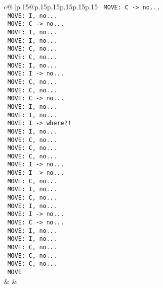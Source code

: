 \documentclass{article}
\begin{document}
{\begin{supertabular}{c@{$\;$}|p{.15\linewidth}@{}p{.15\linewidth}p{.15\linewidth}p{.15\linewidth}p{.15\linewidth}p{.15\linewidth}}
{{{\texttt{ MOVE: C {-}> no...} \\
\texttt{ MOVE: I, no...} \\
\texttt{ MOVE: C {-}> no...} \\
\texttt{ MOVE: I, no...} \\
\texttt{ MOVE: I, no...} \\
\texttt{ MOVE: C, no...} \\
\texttt{ MOVE: C, no...} \\
\texttt{ MOVE: I, no...} \\
\texttt{ MOVE: I {-}> no...} \\
\texttt{ MOVE: C, no...} \\
\texttt{ MOVE: C, no...} \\
\texttt{ MOVE: C {-}> no...} \\
\texttt{ MOVE: I, no...} \\
\texttt{ MOVE: I, no...} \\
\texttt{ MOVE: I {-}> where?!} \\
\texttt{ MOVE: I, no...} \\
\texttt{ MOVE: C, no...} \\
\texttt{ MOVE: C, no...} \\
\texttt{ MOVE: C, no...} \\
\texttt{ MOVE: I {-}> no...} \\
\texttt{ MOVE: I {-}> no...} \\
\texttt{ MOVE: C, no...} \\
\texttt{ MOVE: I, no...} \\
\texttt{ MOVE: C, no...} \\
\texttt{ MOVE: I, no...} \\
\texttt{ MOVE: I {-}> no...} \\
\texttt{ MOVE: C {-}> no...} \\
\texttt{ MOVE: I, no...} \\
\texttt{ MOVE: I, no...} \\
\texttt{ MOVE: C, no...} \\
\texttt{ MOVE: C, no...} \\
\texttt{ MOVE: C, no...} \\
\texttt{ MOVE} \\
            }
        }
    }
    & & \\ \\


\end{supertabular}}
\end{document}
